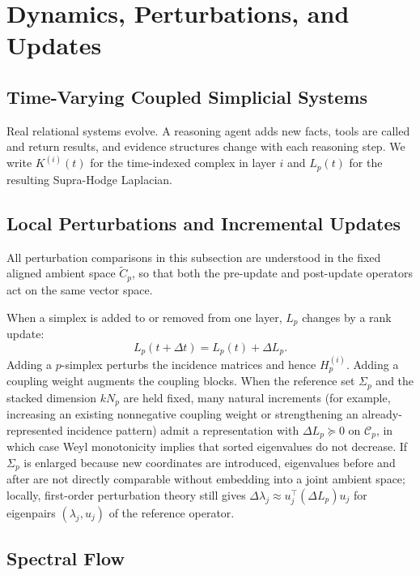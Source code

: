 \documentclass[11pt]{article}
\theoremstyle{definition}
\theoremstyle{remark}
\newcommand{\Ctil}{\widetilde{C}}
\newcommand{\calC}{\mathcal{C}}
\begin{document}
\section{Dynamics, Perturbations, and Updates}
\label{sec:dynamics}

\subsection{Time-Varying Coupled Simplicial Systems}

Real relational systems evolve. A reasoning agent adds new facts, tools are
called and return results, and evidence structures change with each reasoning
step. We write $K^{(i)}(t)$ for the time-indexed complex in layer $i$ and
$L_p(t)$ for the resulting Supra-Hodge Laplacian.

\subsection{Local Perturbations and Incremental Updates}

All perturbation comparisons in this subsection are understood in the fixed
aligned ambient space $\Ctil_p$, so that both the pre-update and post-update
operators act on the same vector space.

When a simplex is added to or removed from one layer, $L_p$ changes by a rank
update:
\[
  L_p(t+\Delta t) = L_p(t) + \Delta L_p.
\]
Adding a $p$-simplex perturbs the incidence matrices and hence $H_p^{(i)}$. Adding
a coupling weight augments the coupling blocks. When the reference set $\Sigma_p$
and the stacked dimension $kN_p$ are held fixed, many natural increments (for
example, increasing an existing nonnegative coupling weight or strengthening an
already-represented incidence pattern) admit a representation with
$\Delta L_p\succeq 0$ on $\calC_p$, in which case Weyl monotonicity implies that
sorted eigenvalues do not decrease. If $\Sigma_p$ is enlarged because new
coordinates are introduced, eigenvalues before and after are not directly
comparable without embedding into a joint ambient space; locally, first-order
perturbation theory still gives $\Delta\lambda_j \approx u_j^\top(\Delta L_p)u_j$
for eigenpairs $(\lambda_j,u_j)$ of the reference operator.

\subsection{Spectral Flow}
\end{document}
